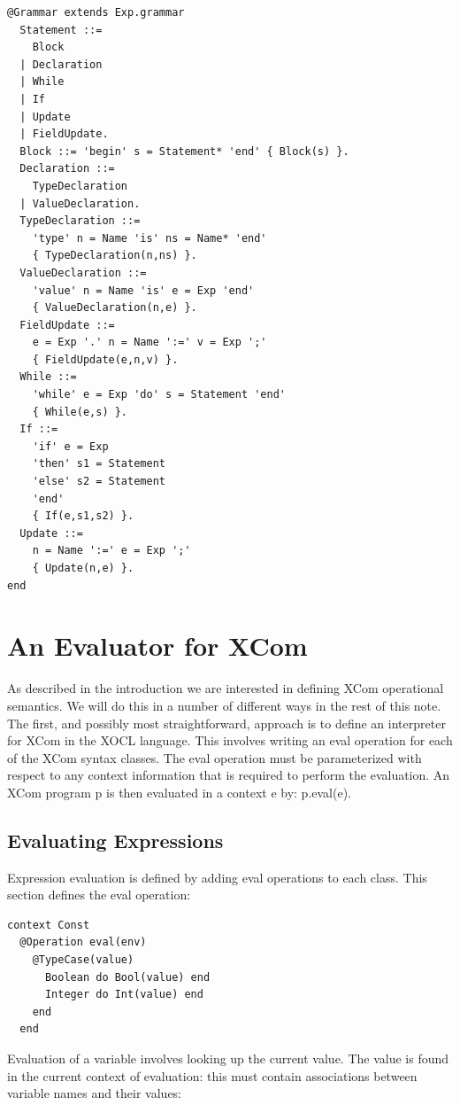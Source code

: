 \begin{lstlisting}
@Grammar extends Exp.grammar
  Statement ::= 
    Block 
  | Declaration 
  | While 
  | If 
  | Update 
  | FieldUpdate.
  Block ::= 'begin' s = Statement* 'end' { Block(s) }.
  Declaration ::= 
    TypeDeclaration 
  | ValueDeclaration.
  TypeDeclaration ::= 
    'type' n = Name 'is' ns = Name* 'end' 
    { TypeDeclaration(n,ns) }.
  ValueDeclaration ::= 
    'value' n = Name 'is' e = Exp 'end' 
    { ValueDeclaration(n,e) }.
  FieldUpdate ::= 
    e = Exp '.' n = Name ':=' v = Exp ';' 
    { FieldUpdate(e,n,v) }.
  While ::= 
    'while' e = Exp 'do' s = Statement 'end' 
    { While(e,s) }.
  If ::= 
    'if' e = Exp 
    'then' s1 = Statement 
    'else' s2 = Statement 
    'end' 
    { If(e,s1,s2) }.
  Update ::= 
    n = Name ':=' e = Exp ';' 
    { Update(n,e) }.
end
\end{lstlisting}
\section{An Evaluator for XCom}

As described in the introduction we are interested in defining XCom
operational semantics. We will do this in a number of different ways
in the rest of this note. The first, and possibly most straightforward,
approach is to define an interpreter for XCom
in the XOCL language. This involves writing an 
eval operation for each of the XCom syntax classes. The 
eval operation must be parameterized with respect to any context
information that is required to perform the evaluation. An XCom program
p is then evaluated in a context 
e by: p.eval(e).


\subsection{Evaluating Expressions}

Expression evaluation is defined by adding eval operations to each
class. This section defines the eval operation:

\begin{lstlisting}
context Const
  @Operation eval(env)
    @TypeCase(value)
      Boolean do Bool(value) end
      Integer do Int(value) end
    end
  end
\end{lstlisting}Evaluation of a variable involves looking up the current value. The
value is found in the current context of evaluation: this must contain
associations between variable names and their values:

